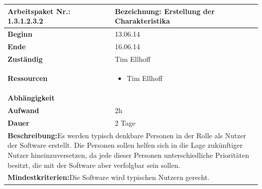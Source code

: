 \documentclass[fontsize=12pt,paper=a4,twoside]{scrartcl}
\begin{document}
\begin{verbatim} 
\end{verbatim}

\begin{tabular}{|p{5.3cm}|p{9.7cm}|}\hline
	\textbf{Arbeitspaket Nr.:} 1.3.1.2.3.2 & \textbf{Bezeichnung:} Erstellung der Charakteristika\\ \hline \hline
	\textbf{Beginn} & 13.06.14\\ \hline
	\textbf{Ende} & 16.06.14\\ \hline
	\textbf{Zuständig} & Tim Ellhoff\\ \hline
	\textbf{Ressourcen} & \begin{itemize}
		\item Tim Ellhoff
	\end{itemize}    \\ \hline
	\textbf{Abhängigkeit} &\\ \hline
	\textbf{Aufwand} & 2h\\ \hline
	\textbf{Dauer} & 2 Tage\\ \hline
	\multicolumn{2}{|p{15cm}|}{\textbf{Beschreibung:}\newline Es werden typisch denkbare Personen in der Rolle als Nutzer der Software erstellt. Die Personen sollen helfen sich in die Lage zukünftiger Nutzer hineinzuversetzen, da jede dieser Personen unterschiedliche Prioritäten besitzt, die mit der Software aber verfolgbar sein sollen. }\\ \hline
	\multicolumn{2}{|p{15cm}|}{\textbf{Mindestkriterien:}\newline Die Software wird typischen Nutzern gerecht. }\\ \hline
\end{tabular}

\begin{verbatim} 
\end{verbatim}
\end{document}
